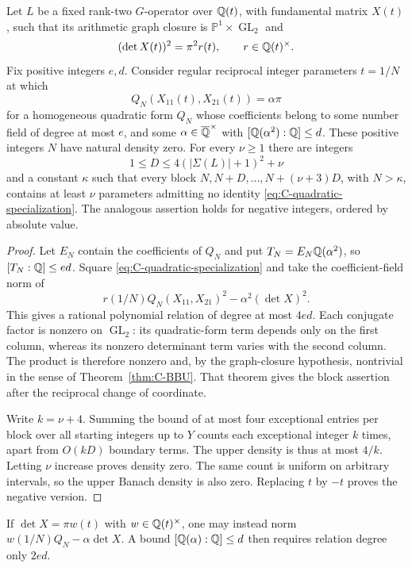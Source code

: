 \begin{lemma}\label{lem:C-quadratic-exclusion}
Let $L$ be a fixed rank-two $G$-operator over $\mathbb Q(t)$, with fundamental
matrix $X(t)$, such that its arithmetic graph closure is
$\mathbb P^1\times\operatorname{GL}_2$ and
\[
 (\det X(t))^2=\pi^2r(t),\qquad r\in\mathbb Q(t)^\times.
\]
Fix positive integers $e,d$. Consider regular reciprocal integer
parameters $t=1/N$ at which
\begin{equation}\label{eq:C-quadratic-specialization}
 Q_N(X_{11}(t),X_{21}(t))=\alpha\pi
\end{equation}
for a homogeneous quadratic form $Q_N$ whose coefficients belong to
some number field of degree at most $e$, and some
$\alpha\in\overline{\mathbb Q}^\times$ with $[\mathbb Q(\alpha^2):\mathbb Q]\le d$.
These positive integers $N$ have natural density zero. For every
$\nu\ge1$ there are integers
\[
 1\le D\le4(|\Sigma(L)|+1)^2+\nu
\]
and a constant $\kappa$ such that every block
$N,N+D,\ldots,N+(\nu+3)D$, with $N>\kappa$, contains at least
$\nu$ parameters admitting no identity
\eqref{eq:C-quadratic-specialization}. The analogous assertion holds
for negative integers, ordered by absolute value.
\end{lemma}
\begin{proof}
Let $E_N$ contain the coefficients of $Q_N$ and put
$T_N=E_N\mathbb Q(\alpha^2)$, so $[T_N:\mathbb Q]\le ed$. Square
\eqref{eq:C-quadratic-specialization} and take the coefficient-field
norm of
\[
 r(1/N)Q_N(X_{11},X_{21})^2-\alpha^2(\det X)^2.
\]
This gives a rational polynomial relation of degree at most $4ed$.
Each conjugate factor is nonzero on $\operatorname{GL}_2$: its
quadratic-form term depends only on the first column, whereas its
nonzero determinant term varies with the second column. The product
is therefore nonzero and, by the graph-closure hypothesis, nontrivial
in the sense of Theorem~\ref{thm:C-BBU}. That theorem gives the block
assertion after the reciprocal change of coordinate.

Write $k=\nu+4$. Summing the bound of at most four exceptional entries
per block over all starting integers up to $Y$ counts each exceptional
integer $k$ times, apart from $O(kD)$ boundary terms. The upper density
is thus at most $4/k$. Letting $\nu$ increase proves density zero.
The same count is uniform on arbitrary intervals, so the upper Banach density is also zero. Replacing $t$ by $-t$ proves the negative version.
\end{proof}

If $\det X=\pi w(t)$ with $w\in\mathbb Q(t)^\times$, one may instead norm
$w(1/N)Q_N-\alpha\det X$. A bound $[\mathbb Q(\alpha):\mathbb Q]\le d$ then
requires relation degree only $2ed$.

